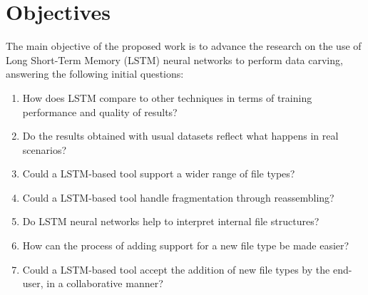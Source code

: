 \section{Objectives}

The main objective of the proposed work is to advance the research on the use of Long Short-Term Memory (LSTM) neural networks to perform data carving, answering the following initial questions:

\begin{enumerate}[itemindent=\parindent,label=\textbf{Q\arabic*.}]
  \item How does LSTM compare to other techniques in terms of training performance and quality of results?
  \item Do the results obtained with usual datasets reflect what happens in real scenarios?
  \item Could a LSTM-based tool support a wider range of file types?
   \item Could a LSTM-based tool handle fragmentation through reassembling?
   \item Do LSTM neural networks help to interpret internal file structures?
  \item How can the process of adding support for a new file type be made easier?
  \item Could a LSTM-based tool accept the addition of new file types by the end-user, in a collaborative manner? 
  \end{enumerate}

